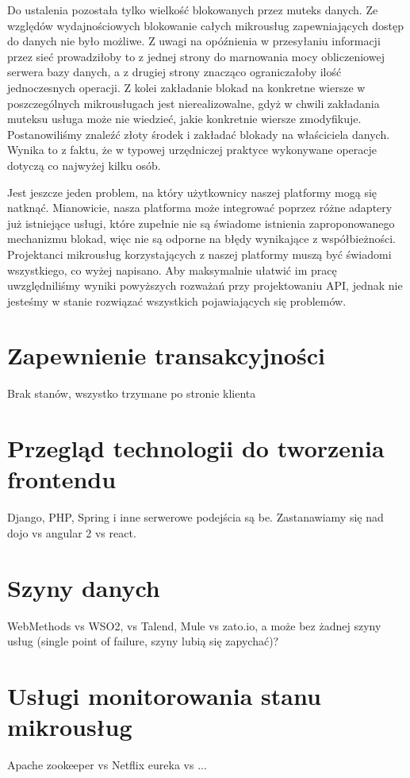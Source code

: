 \documentclass[licencjacka]{pracamgr}
\begin{document}
Do ustalenia pozostała tylko wielkość blokowanych przez muteks danych. Ze względów wydajnościowych blokowanie
całych mikrousług zapewniających dostęp do danych nie było możliwe. Z uwagi na opóźnienia w przesyłaniu informacji
przez sieć prowadziłoby to z jednej strony do marnowania mocy obliczeniowej serwera bazy danych, a z drugiej strony 
znacząco ograniczałoby ilość jednoczesnych operacji. Z kolei zakładanie blokad na konkretne wiersze w poszczególnych
mikrousługach jest nierealizowalne, gdyż w chwili zakładania muteksu usługa może nie wiedzieć, jakie konkretnie
wiersze zmodyfikuje. Postanowiliśmy znaleźć złoty środek i zakładać blokady na właściciela danych. Wynika to z
faktu, że w typowej urzędniczej praktyce wykonywane operacje dotyczą co najwyżej kilku osób.

Jest jeszcze jeden problem, na który użytkownicy naszej platformy mogą się natknąć. Mianowicie, nasza platforma
może integrować poprzez różne adaptery już istniejące usługi, które zupełnie nie są świadome istnienia
zaproponowanego mechanizmu blokad, więc nie są odporne na błędy wynikające z współbieżności.
Projektanci mikrousług korzystających z naszej platformy muszą być świadomi wszystkiego, co wyżej napisano.
Aby maksymalnie ułatwić im pracę uwzględniliśmy wyniki powyższych rozważań  przy projektowaniu API, jednak nie
jesteśmy w stanie rozwiązać wszystkich pojawiających się problemów.

\section{Zapewnienie transakcyjności}

Brak stanów, wszystko trzymane po stronie klienta

\section{Przegląd technologii do tworzenia frontendu}
Django, PHP, Spring i inne serwerowe podejścia są be. Zastanawiamy się nad dojo vs angular 2 vs react.
\section{Szyny danych}
WebMethods vs WSO2, vs Talend, Mule vs zato.io, a może bez żadnej szyny usług (single point of failure, szyny lubią się zapychać)?
\section{Usługi monitorowania stanu mikrousług}
Apache zookeeper vs Netflix eureka vs ...
\end{document}
